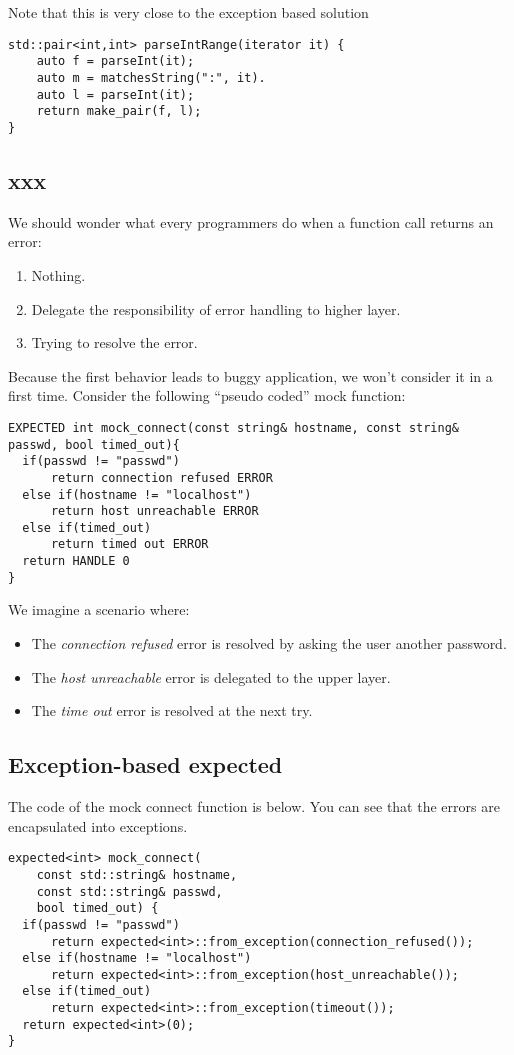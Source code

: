 \documentclass[a4paper,10pt]{article}
\begin{document}
Note that this is very close to the exception based solution

\begin{lstlisting}
std::pair<int,int> parseIntRange(iterator it) {
    auto f = parseInt(it);
    auto m = matchesString(":", it).
    auto l = parseInt(it);       
    return make_pair(f, l);
}
\end{lstlisting}


\subsection{xxx}
We should wonder what every programmers do when a function call returns an error:

\begin{enumerate}
 \item Nothing.
 \item Delegate the responsibility of error handling to higher layer.
 \item Trying to resolve the error.
\end{enumerate}

Because the first behavior leads to buggy application, we won't consider it in a first time. Consider the following ``pseudo coded'' mock function:

\begin{lstlisting}
EXPECTED int mock_connect(const string& hostname, const string& passwd, bool timed_out){
  if(passwd != "passwd")
      return connection refused ERROR
  else if(hostname != "localhost")
      return host unreachable ERROR
  else if(timed_out)
      return timed out ERROR
  return HANDLE 0
}
\end{lstlisting}

We imagine a scenario where:

\begin{itemize}
 \item The \textit{connection refused} error is resolved by asking the user another password.
 \item The \textit{host unreachable} error is delegated to the upper layer.
 \item The \textit{time out} error is resolved at the next try.
\end{itemize}

\subsection{Exception-based expected}

The code of the mock connect function is below. You can see that the errors are encapsulated into exceptions.
\begin{lstlisting}
expected<int> mock_connect(
    const std::string& hostname, 
    const std::string& passwd, 
    bool timed_out) {
  if(passwd != "passwd")
      return expected<int>::from_exception(connection_refused());
  else if(hostname != "localhost")
      return expected<int>::from_exception(host_unreachable());
  else if(timed_out)
      return expected<int>::from_exception(timeout());
  return expected<int>(0);
}
\end{lstlisting}
\end{document}

